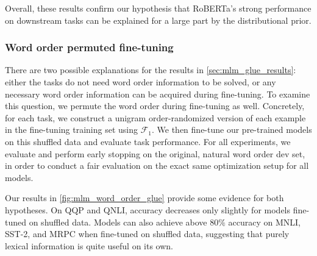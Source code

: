\documentclass[letterpaper, 12pt]{report}
\begin{document}
Overall, these results confirm our hypothesis that RoBERTa's strong performance on downstream tasks can be explained for a large part by the distributional prior.

\subsubsection{Word order permuted fine-tuning}

There are two possible explanations for the results in \autoref{sec:mlm_glue_results}: either the tasks do not need word order information to be solved, or any necessary word order information can be acquired during fine-tuning.
To examine this question, we permute the word order during fine-tuning as well.
Concretely, for each task, we construct a unigram order-randomized version of each example in the fine-tuning training set using $\mathcal{F}_1$. We then fine-tune our pre-trained models on this shuffled data and evaluate task performance. For all experiments, we evaluate and perform early stopping on the original, natural word order dev set, in order to conduct a fair evaluation on the exact same optimization setup for all models.
%

Our results in \autoref{fig:mlm_word_order_glue} provide some evidence for both hypotheses.
On QQP and QNLI, accuracy decreases only slightly for models fine-tuned on shuffled data. %
Models can also achieve above $80\%$ accuracy on MNLI, SST-2, and MRPC when fine-tuned on shuffled data,
suggesting that purely lexical information is quite useful on its own.
\end{document}
